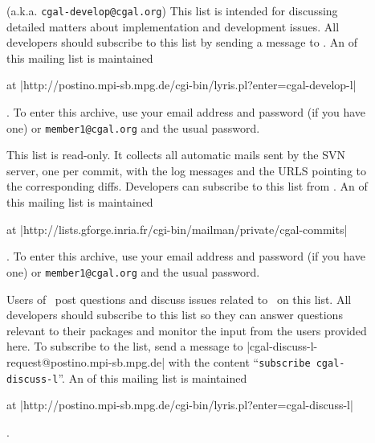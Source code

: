 \begin{description}
\item[]
     (a.k.a. \texttt{cgal-develop@cgal.org})
     This list is intended for discussing detailed matters
     about implementation and development issues.  All developers should
     subscribe to this list by sending a message to
     .
     An 
     of this mailing list is maintained%
     \begin{ccTexOnly}
     at \nonlinkedpath|http://postino.mpi-sb.mpg.de/cgi-bin/lyris.pl?enter=cgal-develop-l|
     \end{ccTexOnly}.  To enter this archive, use your email address and
     password (if you have one) or
     \texttt{member1@cgal.org} and the usual password.

\item[]
     This list is read-only.  It collects all automatic mails sent by
     the SVN server, one per commit, with the log messages and the URLS
     pointing to the corresponding diffs.
     Developers can subscribe to this list from
     .
     An 
     of this mailing list is maintained%
     \begin{ccTexOnly}
     at \nonlinkedpath|http://lists.gforge.inria.fr/cgi-bin/mailman/private/cgal-commits|
     \end{ccTexOnly}.  To enter this archive, use your email address and
     password (if you have one) or
     \texttt{member1@cgal.org} and the usual password.

\item[]
     Users of \cgal\ post questions and discuss issues
     related to \cgal\ on this list.  All developers should subscribe to this
     list so they can answer questions relevant to their packages and monitor
     the input from the users provided here.
     To subscribe to the list, send a message to
     {\nonlinkedpath|cgal-discuss-l-request@postino.mpi-sb.mpg.de|}
     with the content ``\texttt{subscribe cgal-discuss-l}''.
     An 
     of this mailing list is maintained%
     \begin{ccTexOnly}
     at \nonlinkedpath|http://postino.mpi-sb.mpg.de/cgi-bin/lyris.pl?enter=cgal-discuss-l|
     \end{ccTexOnly}.


\end{description}
